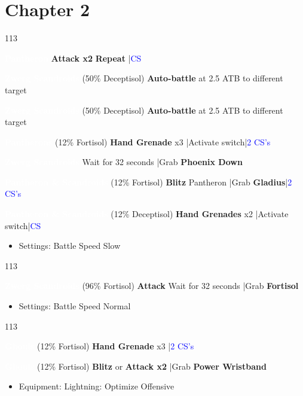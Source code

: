 \documentclass[a4paper, fontsize=11pt, DIV=26, parskip=full]{scrartcl}
\let\olditem\item
\renewcommand{\item}{%
	\olditem\vspace{-5pt}}
\newenvironment{menu}{
	\begin{tcolorbox}[enhanced, colframe=yellow!50!red,	colbacktitle=yellow!50!red, coltitle=red!25!black, title=\textbf{Menu}]
		\begin{itemize}[leftmargin=*]
	}{\end{itemize}\end{tcolorbox}}
\newenvironment{mainlist}{\begin{dinglist}{113}}{\end{dinglist}}
\renewcommand{\skip}{{\textcolor{blue}{CS}}}
\newcommand{\skips}[1]{{\textcolor{blue}{#1 CS's}}}
\newcommand{\shortfight}[1]{\colorbox[rgb]{0.3,0.3,0.3}{\bfseries\textcolor{white}{#1}}}
\renewcommand{\to}{ \ding{219} }
\begin{document}
	\hrulefill
	\section{Chapter 2}
	
	\begin{mainlist}
		\item \skips{2}
		\item \shortfight{Pantheron} \textbf{Attack x2}\to \textbf{Repeat} |\skip
		\item \shortfight{Zwerg Scandroids} (50\% Deceptisol) \textbf{Auto-battle} at 2.5 ATB to different target
		\item \shortfight{Zwerg Scandroids} (50\% Deceptisol) \textbf{Auto-battle} at 2.5 ATB to different target
		\item \skips{2}
		\item \shortfight{Pantherons} (12\% Fortisol) \textbf{Hand Grenade} x3 |Activate switch|\skips{2}
		\item \shortfight{Zwerg Scandroids} Wait for 32 seconds |Grab \textbf{Phoenix Down}
		\item \shortfight{Pantheron \& Scandroids} (12\% Fortisol) \textbf{Blitz} Pantheron |Grab \textbf{Gladius}|\skips{2}
		\item \shortfight{Pantheron \& Scandroids} (12\% Deceptisol) \textbf{Hand Grenades} x2 |Activate switch|\skip
	\end{mainlist}
	\begin{menu}
		\item Settings: Battle Speed Slow
	\end{menu}
	\begin{mainlist}
		\item \skips{2}
		\item \shortfight{Zwerg Scandroids} (96\% Fortisol) \textbf{Attack}\to Wait for 32 seconds |Grab \textbf{Fortisol}
	\end{mainlist}
	\begin{menu}
		\item Settings: Battle Speed Normal
	\end{menu}
	\begin{mainlist}
		\item \skip
		\item \shortfight{Ghouls} (12\% Fortisol) \textbf{Hand Grenade} x3 |\skips{2}
		\item \shortfight{Ghouls} (12\% Fortisol) \textbf{Blitz} or \textbf{Attack x2} |Grab \textbf{Power Wristband}
	\end{mainlist}
	\begin{menu}
		\item Equipment: Lightning: Optimize Offensive
	\end{menu}
\end{document}
